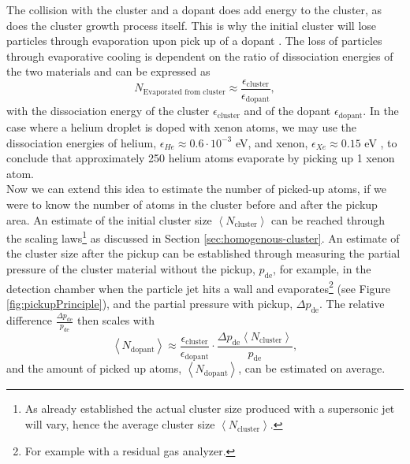 %
The collision with the cluster and a dopant does add energy to the cluster, as does the cluster growth process itself. This is why the initial cluster will lose particles through evaporation upon pick up of a dopant \citep{Gomez-2011-JCP}. The loss of particles through evaporative cooling is dependent on the ratio of dissociation energies of the two materials and can be expressed as
\begin{equation}
N_{\text{Evaporated from cluster}} \approx \frac{\epsilon_{\text{cluster}}}{\epsilon_{\text{dopant}}},
\label{eq:evaporated-amount}
\end{equation}
with the dissociation energy of the cluster $\epsilon_{\text{cluster}}$ and of the dopant $\epsilon_{\text{dopant}}$. In the case where a helium droplet is doped with xenon atoms, we may use the dissociation energies of helium, $\epsilon_{He}\approx 0.6\cdot 10^{-3}$ eV, and xenon, $\epsilon_{Xe}\approx 0.15$ eV \citep{Gomez-2011-JCP,Gomez-2014-Science}, to conclude that approximately 250 helium atoms evaporate by picking up 1 xenon atom.\\[1\baselineskip]
%
Now we can extend this idea to estimate the number of picked-up atoms, if we were to know the number of atoms in the cluster before and after the pickup area. An estimate of the initial cluster size $\left\langle N_{\text{cluster}}\right\rangle$ can be reached through the scaling laws\footnote{As already established the actual cluster size produced with a supersonic jet will vary, hence the average cluster size $\left\langle N_{\text{cluster}}\right\rangle$.} as discussed in Section \ref{sec:homogenous-cluster}. An estimate of the cluster size after the pickup can be established through measuring the partial pressure of the cluster material without the pickup, $p_{\text{de}}$, for example, in the detection chamber when the particle jet hits a wall and evaporates\footnote{For example with a residual gas analyzer.} (see Figure \ref{fig:pickupPrinciple}), and the partial pressure with pickup, $\Delta p_{\text{de}}$. The relative difference $\tfrac{\Delta p_{\text{de}}}{p_{\text{de}}}$ then scales with
\begin{equation}
\left\langle N_{\text{dopant}}\right\rangle \approx \frac{\epsilon_{\text{cluster}}}{\epsilon_{\text{dopant}}} \cdot \frac{\Delta p_{\text{de}} \left\langle N_{\text{cluster}}\right\rangle}{p_{\text{de}}},
\label{eq:average-dopant}
\end{equation}
and the amount of picked up atoms, $\left\langle N_{\text{dopant}}\right\rangle$, can be estimated on average.
%
